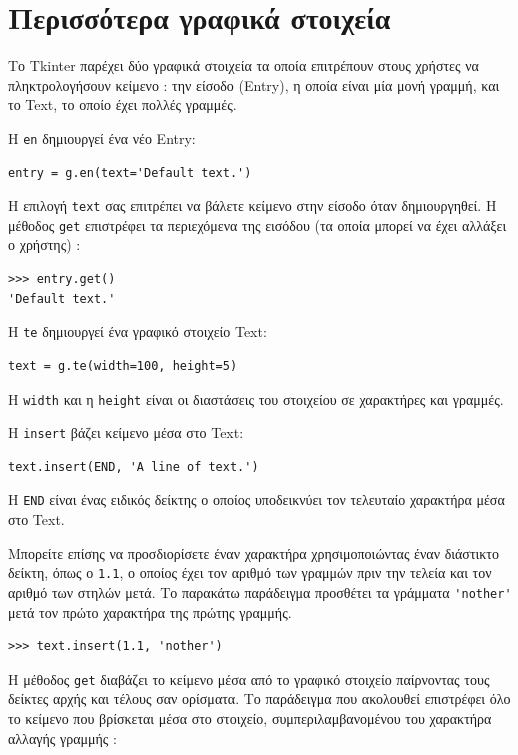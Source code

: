 \documentclass[10pt]{book}
\begin{document}
 
\section{Περισσότερα γραφικά στοιχεία}

Το  Tkinter  παρέχει δύο γραφικά στοιχεία τα οποία επιτρέπουν στους χρήστες να 
πληκτρολογήσουν κείμενο :  την είσοδο  (Entry),  η οποία είναι μία μονή γραμμή, 
και το  Text,  το οποίο έχει πολλές γραμμές.

Η  {\tt en}  δημιουργεί ένα νέο  Entry:

\begin{verbatim}
entry = g.en(text='Default text.')
\end{verbatim}
%
 Η επιλογή  {\tt text}  σας επιτρέπει να βάλετε κείμενο στην είσοδο όταν δημιουργηθεί.  Η μέθοδος  {\tt get}  επιστρέφει τα περιεχόμενα της εισόδου (τα οποία μπορεί να έχει αλλάξει ο χρήστης) :

\begin{verbatim}
>>> entry.get()
'Default text.'
\end{verbatim}
%
 Η  {\tt te}  δημιουργεί ένα γραφικό στοιχείο  Text:

\begin{verbatim}
text = g.te(width=100, height=5)
\end{verbatim}
%
 Η  {\tt width}  και η  {\tt height}  είναι οι διαστάσεις του στοιχείου σε 
χαρακτήρες και γραμμές.

Η  {\tt insert}  βάζει κείμενο μέσα στο  Text:

\begin{verbatim}
text.insert(END, 'A line of text.')
\end{verbatim}
%
 Η  {\tt END}  είναι ένας ειδικός δείκτης ο οποίος υποδεικνύει τον τελευταίο 
χαρακτήρα μέσα στο  Text.

 Μπορείτε επίσης να προσδιορίσετε έναν χαρακτήρα χρησιμοποιώντας έναν διάστικτο δείκτη, 
όπως ο  {\tt 1.1},  ο οποίος έχει τον αριθμό των γραμμών πριν την τελεία και τον 
αριθμό των στηλών μετά.  Το παρακάτω παράδειγμα προσθέτει τα γράμματα  \verb"'nother'"  
μετά τον πρώτο χαρακτήρα της πρώτης γραμμής. 

\begin{verbatim}
>>> text.insert(1.1, 'nother')
\end{verbatim}
%
 Η μέθοδος  {\tt get}  διαβάζει το κείμενο μέσα από το γραφικό στοιχείο παίρνοντας τους δείκτες αρχής και τέλους σαν ορίσματα.  Το παράδειγμα που ακολουθεί επιστρέφει όλο το 
κείμενο που βρίσκεται μέσα στο στοιχείο, συμπεριλαμβανομένου του χαρακτήρα αλλαγής γραμμής :
\end{document}
